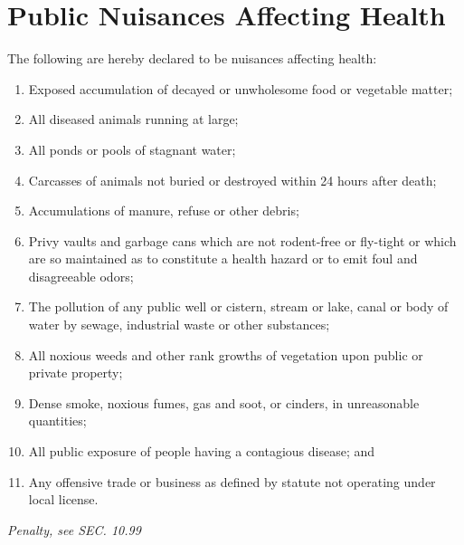 \section{Public Nuisances Affecting Health}
The following are hereby declared to be nuisances affecting health:
\begin{enumerate}[{\indent}A)]
    \item Exposed accumulation of decayed or unwholesome food or vegetable matter;
    \item All diseased animals running at large;
    \item All ponds or pools of stagnant water;
    \item Carcasses of animals not buried or destroyed within 24 hours after death;
    \item Accumulations of manure, refuse or other debris;
    \item Privy vaults and garbage cans which are not rodent-free or fly-tight or which are so maintained as to constitute a health hazard or to emit foul and disagreeable odors;
    \item The pollution of any public well or cistern, stream or lake, canal or body of water by sewage, industrial waste or other substances;
    \item All noxious weeds and other rank growths of vegetation upon public or private property;
    \item Dense smoke, noxious fumes, gas and soot, or cinders, in unreasonable quantities;
    \item All public exposure of people having a contagious disease; and
    \item Any offensive trade or business as defined by statute not operating under local license.
\end{enumerate}
\emph{Penalty, see SEC. 10.99}
